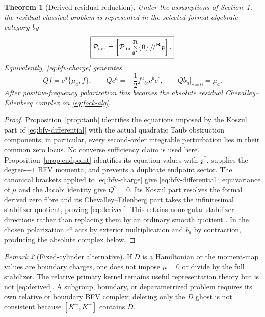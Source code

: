 \documentclass[11pt]{article}
\newtheorem{theorem}{Theorem}[section]
\theoremstyle{remark}
\newtheorem{remark}[theorem]{Remark}
\newcommand{\g}{\mathfrak g}
\begin{document}
\begin{theorem}[Derived residual reduction]\label{thm:derived}
Under the assumptions of Section~1, the residual classical problem is
represented in the selected formal algebraic category by
\begin{equation}\label{eq:derived}
 \boxed{
 \mathcal P_{\rm der}
 =\left[\mathcal P_{\rm lin}
 \mathop{\times}^{\mathbf R}_{\g^*}\{0\}\,/\!/^{\mathbf R}\g\right].}
\end{equation}
Equivalently, \eqref{eq:bfv-charge} generates
\begin{equation}\label{eq:bfv-differential}
 Qf=c^a\{\mu_a,f\},\qquad
 Qc^a=-\frac12f^a{}_{bc}c^bc^c,
 \qquad Qb_a\big|_{c=0}=\mu_a.
\end{equation}
After positive-frequency polarization this becomes the absolute residual
Chevalley--Eilenberg complex on \eqref{eq:fock-alg}.
\end{theorem}

\begin{proof}
Proposition~\ref{prop:taub} identifies the equations imposed by the Koszul
part of \eqref{eq:bfv-differential} with the actual quadratic Taub
obstruction components; in particular, every second-order integrable
perturbation lies in their common zero locus.  No converse sufficiency claim
is used here.
Proposition~\ref{prop:endpoint} identifies its equation values with
$\g^*$, supplies the degree-$-1$ BFV momenta, and prevents a duplicate
endpoint sector.  The canonical brackets applied to \eqref{eq:bfv-charge}
give \eqref{eq:bfv-differential}; equivariance of $\mu$ and the Jacobi
identity give $Q^2=0$.  Its Koszul part resolves the formal derived zero
fibre and its Chevalley--Eilenberg part takes the infinitesimal stabilizer
quotient, proving \eqref{eq:derived}.  This retains nonregular stabilizer
directions rather than replacing them by an ordinary smooth quotient
\cite{CattaneoMnevReshetikhin}.  In the chosen polarization $c^a$ acts by
exterior multiplication and $b_a$ by contraction, producing the absolute
complex below.
\end{proof}

\begin{remark}[Fixed-cylinder alternative]
If $D$ is a Hamiltonian or the moment-map values are boundary charges, one
does not impose $\mu=0$ or divide by the full stabilizer.  The relative
primary kernel remains useful representation theory but is not
\eqref{eq:derived}.  A subgroup, boundary, or deparametrized problem requires
its own relative or boundary BFV complex; deleting only the $D$ ghost is not
consistent because $[K^-,K^+]$ contains $D$.
\end{remark}
\end{document}

